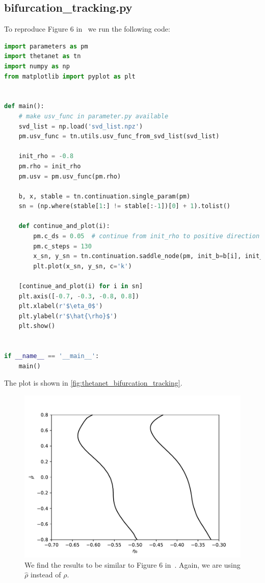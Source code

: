\documentclass[bibliography=totoc, twoside]{article}
\numberwithin{equation}{section}
\begin{document}
\subsection*{bifurcation\_tracking.py}
To reproduce Figure 6 in~\cite{laing2019} we run the following code:
\begin{lstlisting}[language=python]
import parameters as pm
import thetanet as tn
import numpy as np
from matplotlib import pyplot as plt


def main():
    # make usv_func in parameter.py available
    svd_list = np.load('svd_list.npz')
    pm.usv_func = tn.utils.usv_func_from_svd_list(svd_list)

    init_rho = -0.8
    pm.rho = init_rho
    pm.usv = pm.usv_func(pm.rho)

    b, x, stable = tn.continuation.single_param(pm)
    sn = (np.where(stable[1:] != stable[:-1])[0] + 1).tolist()

    def continue_and_plot(i):
        pm.c_ds = 0.05  # continue from init_rho to positive direction
        pm.c_steps = 130
        x_sn, y_sn = tn.continuation.saddle_node(pm, init_b=b[i], init_x=x[i], init_y=init_rho)[1:]
        plt.plot(x_sn, y_sn, c='k')

    [continue_and_plot(i) for i in sn]
    plt.axis([-0.7, -0.3, -0.8, 0.8])
    plt.xlabel(r'$\eta_0$')
    plt.ylabel(r'$\hat{\rho}$')
    plt.show()


if __name__ == '__main__':
    main()
\end{lstlisting}
The plot is shown in \autoref{fig:thetanet_bifurcation_tracking}.
\begin{figure}
    \centering
    \includegraphics[width=.8\linewidth]{bifurcation_tracking.pdf}
    \caption{We find the results to be similar to Figure 6 in~\cite{laing2019}.
    Again, we are using $\hat{\rho}$ instead of $\rho$.}
    \label{fig:thetanet_bifurcation_tracking}
\end{figure}

\newpage


\end{document}
